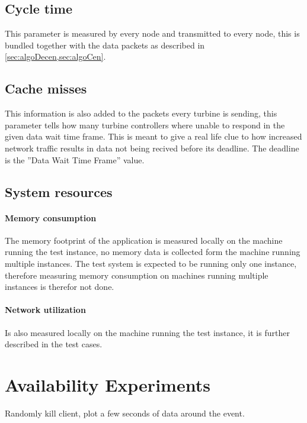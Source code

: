\subsection{Cycle time}
This parameter is measured by every node and transmitted to every node, this is bundled together with the data packets as described in \cref{sec:algoDecen,sec:algoCen}.




\subsection{Cache misses}
This information is also added to the packets every turbine is sending, this parameter tells how many turbine controllers where unable to respond in the given data wait time frame. This is meant to give a real life clue to how increased network traffic results in data not being recived before its deadline. The deadline is the ''Data Wait Time Frame'' value.




\subsection{System resources}
\paragraph{Memory consumption} The memory footprint of the application is measured locally on the machine running the test instance, no memory data is collected form the machine running multiple instances. The test system is expected to be running only one instance, therefore measuring memory consumption on machines running multiple instances is therefor not done.	
	
\paragraph{Network utilization} Is also measured locally on the machine running the test instance, it is further described in the test cases.



	
\section{Availability Experiments}

Randomly kill client, plot a few seconds of data around the event.



